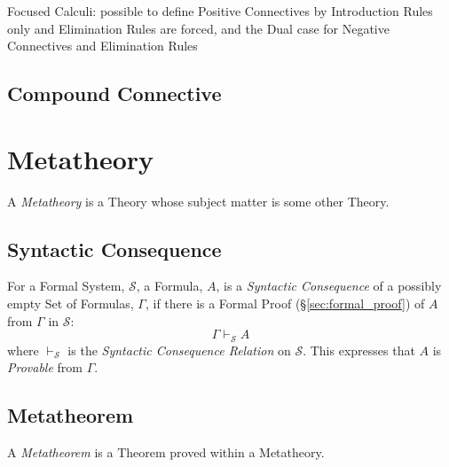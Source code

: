 Focused Calculi: possible to define Positive Connectives by
Introduction Rules only and Elimination Rules are forced, and the Dual
case for Negative Connectives and Elimination Rules



\subsection{Compound Connective}\label{sec:compound_connective}



\section{Metatheory} \label{sec:metatheory}

A \emph{Metatheory} is a Theory whose subject matter is some other
Theory.



\subsection{Syntactic Consequence}\label{sec:syntactic_consequence}

For a Formal System, $\mathcal{S}$, a Formula, $A$, is a \emph{Syntactic
  Consequence} of a possibly empty Set of Formulas, $\Gamma$, if there
is a Formal Proof (\S\ref{sec:formal_proof}) of $A$ from $\Gamma$ in
$\mathcal{S}$:
\[
  \Gamma \vdash_{\mathcal{S}} A
\]
where $\vdash_{\mathcal{S}}$ is the \emph{Syntactic Consequence
  Relation} on $\mathcal{S}$. This expresses that $A$ is
\emph{Provable} from $\Gamma$.



\subsection{Metatheorem}\label{sec:metatheorem}

A \emph{Metatheorem} is a Theorem proved within a Metatheory.



